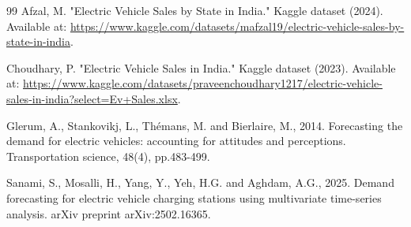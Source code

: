 \documentclass[pdflatex,sn-mathphys-num]{sn-jnl}%
\begin{document}
\begin{thebibliography}{99}
Afzal, M.
"Electric Vehicle Sales by State in India." Kaggle dataset (2024).
Available at: \url{https://www.kaggle.com/datasets/mafzal19/electric-vehicle-sales-by-state-in-india}.

Choudhary, P.
"Electric Vehicle Sales in India." Kaggle dataset (2023).
Available at: \url{https://www.kaggle.com/datasets/praveenchoudhary1217/electric-vehicle-sales-in-india?select=Ev+Sales.xlsx}.

Glerum, A., Stankovikj, L., Thémans, M. and Bierlaire, M., 2014. Forecasting the demand for electric vehicles: accounting for attitudes and perceptions. Transportation science, 48(4), pp.483-499.

Sanami, S., Mosalli, H., Yang, Y., Yeh, H.G. and Aghdam, A.G., 2025. Demand forecasting for electric vehicle charging stations using multivariate time-series analysis. arXiv preprint arXiv:2502.16365.

\end{thebibliography}
\end{document}
